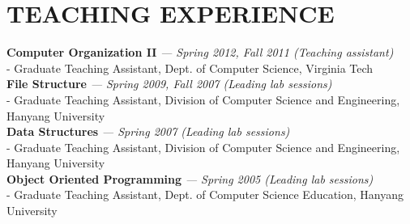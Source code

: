 \section{TEACHING EXPERIENCE} 
\vspace{0.07in} 
   {\bf Computer Organization II}
   {\it \footnotesize --- Spring 2012, Fall 2011 (Teaching assistant)}\\
      - {\small Graduate Teaching Assistant, Dept. of Computer Science, Virginia
      Tech}
\vspace{0.02in}\\
   {\bf File Structure}
   {\it \footnotesize --- Spring 2009, Fall 2007 (Leading lab sessions)}\\
      - {\small Graduate Teaching Assistant, Division of Computer Science and
      Engineering, Hanyang University}
\vspace{0.02in}\\
   {\bf Data Structures}
   {\it \footnotesize --- Spring 2007 (Leading lab sessions)}\\
      - {\small Graduate Teaching Assistant, Division of Computer Science and
      Engineering, Hanyang University}
\vspace{0.02in}\\
   {\bf Object Oriented Programming}
   {\it \footnotesize --- Spring 2005 (Leading lab sessions)}\\
      - {\small Graduate Teaching Assistant, Dept. of Computer Science
      Education, Hanyang University}

